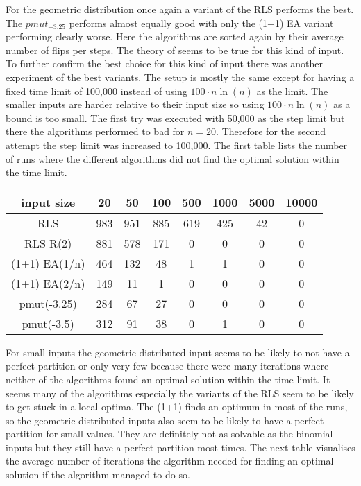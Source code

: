For the geometric distribution once again a variant of the RLS performs the best.
The $pmut_{-3.25}$ performs almost equally good with only the (1+1) EA variant performing clearly worse.
Here the algorithms are sorted again by their average number of flips per steps. The theory of seems to be true for this kind of input.\newline
To further confirm the best choice for this kind of input there was another experiment of the best variants.
The setup is mostly the same except for having a fixed time limit of 100,000 instead of using $100 \cdot n\ln(n)$ as the limit.
The smaller inputs are harder relative to their input size so using $100 \cdot n\ln(n)$ as a bound is too small.
The first try was executed with 50,000 as the step limit but there the algorithms performed to bad for $n=20$.
Therefore for the second attempt the step limit was increased to 100,000.
The first table lists the number of runs where the different algorithms did not find the optimal solution within the time limit.

\begin{tabular}{cccccccc}

      input size    & 20  & 50  & 100 & 500 & 1000 & 5000 & 10000 \\\hline
      RLS           & 983 & 951 & 885 & 619 & 425  & 42   & 0     \\
      RLS-R(2)      & 881 & 578 & 171 & 0   & 0    & 0    & 0     \\
      (1+1) EA(1/n) & 464 & 132 & 48  & 1   & 1    & 0    & 0     \\
      (1+1) EA(2/n) & 149 & 11  & 1   & 0   & 0    & 0    & 0     \\
      pmut(-3.25)   & 284 & 67  & 27  & 0   & 0    & 0    & 0     \\
      pmut(-3.5)    & 312 & 91  & 38  & 0   & 1    & 0    & 0     \\
\end{tabular}

For small inputs the geometric distributed input seems to be likely to not have a perfect partition or only very few because there were many iterations where neither of the algorithms found an optimal solution within the time limit.
It seems many of the algorithms especially the variants of the RLS seem to be likely to get stuck in a local optima.
The (1+1) finds an optimum in most of the runs, so the geometric distributed inputs also seem to be likely to have a perfect partition for small values.
They are definitely not as solvable as the binomial inputs but they still have a perfect partition most times.
The next table visualises the average number of iterations the algorithm needed for finding an optimal solution if the algorithm managed to do so.

